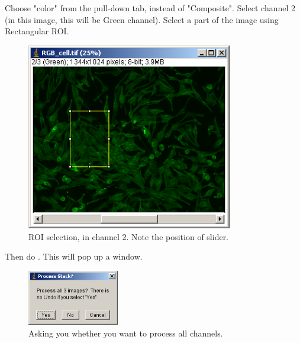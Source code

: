 \begin{indentexercise}{1}
Choose "color" from the pull-down tab, instead of "Composite". Select channel 2 (in this image, this will be Green channel). Select a part of the image using Rectangular ROI. 
\begin{figure}[H]
\begin{center}
\includegraphics[width=9cm]{img/CMCIBasicCourse201102-img18.png}
\caption{ ROI selection, in channel 2. Note the position of slider.}
\label{fig:img18}
\end{center}
\end{figure}

Then do . This will pop up a window. 
\begin{figure}[H]
\begin{center}
\includegraphics[width=4cm]{img/CMCIBasicCourse201102-img19.png}
\caption{ Asking you whether you want to process all channels.}
\label{fig:img19}
\end{center}
\end{figure}


\end{indentexercise}
